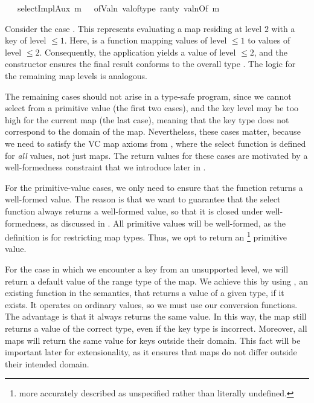 \begin{isabellebody}
\ \ {\isacharbar}{\kern0pt}\ {\isachardoublequoteopen}selectImplAux\ m\ {\isacharunderscore}{\kern0pt}\ {\isacharequal}{\kern0pt}\ ofValn\ {\isacharparenleft}{\kern0pt}val{\isacharunderscore}{\kern0pt}of{\isacharunderscore}{\kern0pt}type\ {\isacharparenleft}{\kern0pt}ran{\isacharunderscore}{\kern0pt}ty\ {\isacharparenleft}{\kern0pt}valnOf\ m{\isacharparenright}{\kern0pt}{\isacharparenright}{\kern0pt}{\isacharparenright}{\kern0pt}{\isachardoublequoteclose}
\end{isabellebody}


Consider the case .
This represents evaluating a map residing at level $2$ with a key of level $\le 1$.
Here,  is a function mapping values of level $\le 1$ to values of level $\le 2$.
Consequently, the application  yields a value of level $\le 2$, and the  constructor ensures the final result conforms to the overall type .
The logic for the remaining map levels is analogous.

The remaining cases should not arise in a type-safe program,
since we cannot select from a primitive value (the first two cases),
and the key level may be too high for the current map (the last case),
meaning that the key type does not correspond to the domain of the map.
Nevertheless, these cases matter,
because we need to satisfy the VC map axioms from ,
where the select function is defined for \emph{all} values,
not just maps.
The return values for these cases are motivated by a well-formedness constraint
that we introduce later in .

For the primitive-value cases, we only need to ensure
that the function returns a well-formed value.
The reason is that we want to guarantee that the select function always returns a well-formed value,
so that it is closed under well-formedness, as discussed in .
All primitive values will be well-formed, as the definition is for restricting map types.
Thus, we opt to return an \footnote{more accurately described as unspecified rather than literally undefined.} primitive value.

For the case in which we encounter a key from an unsupported level,
we will return a default value of the range type of the map.
We achieve this by using , an existing function in the semantics,
that returns a value of a given type, if it exists.
It operates on ordinary values, so we must use our conversion functions.
The advantage is that it always returns the same value.
In this way, the map still returns a value of the correct type,
even if the key type is incorrect.
Moreover, all maps will return the same value
for keys outside their domain.
This fact will be important later for extensionality,
as it ensures that maps do not differ outside their intended domain.

